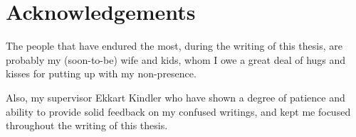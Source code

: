 \chapter{Acknowledgements}
The people that have endured the most, during the writing of this thesis, are probably my (soon-to-be) wife and kids, whom I owe a great deal of hugs and kisses for putting up with my non-presence.\medskip

\noindent Also, my supervisor Ekkart Kindler who have shown a degree of patience and ability to provide solid feedback on my confused writings, and kept me focused throughout the writing of this thesis.
